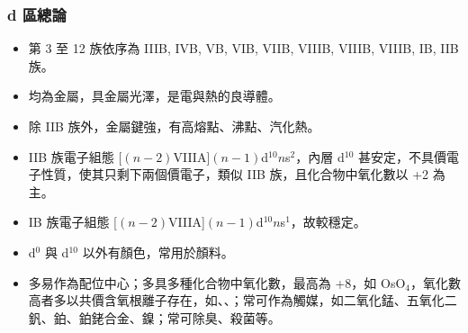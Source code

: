 \documentclass[a4paper,12pt]{report}
\begin{document}
\begin{itemize}
\begin{itemize}
\subsubsection{d 區總論}
\begin{itemize}
\item 第 3 至 12 族依序為 IIIB, IVB, VB, VIB, VIIB, VIIIB, VIIIB, VIIIB, IB, IIB 族。
\item 均為金屬，具金屬光澤，是電與熱的良導體。
\item 除 IIB 族外，金屬鍵強，有高熔點、沸點、汽化熱。
\item IIB 族電子組態 [$(n-2)$VIIIA]$(n-1)$d$^{10}n$s$^2$，內層 d$^{10}$ 甚安定，不具價電子性質，使其只剩下兩個價電子，類似 IIB 族，且化合物中氧化數以 +2 為主。
\item IB 族電子組態 [$(n-2)$VIIIA]$(n-1)$d$^{10}n$s$^1$，故較穩定。
\item d$^0$ 與 d$^{10}$ 以外有顏色，常用於顏料。
\item 多易作為配位中心；多具多種化合物中氧化數，最高為 +8，如 OsO$_4$，氧化數高者多以共價含氧根離子存在，如、、；常可作為觸媒，如二氧化錳、五氧化二釩、鉑、鉑銠合金、鎳；常可除臭、殺菌等。
\end{itemize}

\end{itemize}
\end{itemize}
\end{document}
